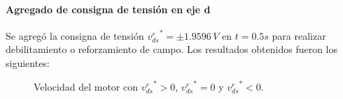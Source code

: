 \documentclass[a4paper, 10pt, onecolumn,journal]{ieeeconf}
\begin{document}
\paragraph{\textbf{Agregado de consigna de tensión en eje d}}
Se agregó la consigna de tensión ${v^r_{ds}}^* = \pm 1.9596 \, V $ en $t = 0.5 s$ para realizar debilitamiento o reforzamiento de campo. Los resultados obtenidos fueron los siguientes:

\begin{figure}[H]
	\centering
	\begin{adjustbox}{max width=\columnwidth}
	\end{adjustbox}
	\caption{Velocidad del motor con ${v^r_{ds}}^* > 0$, ${v^r_{ds}}^* = 0$ y ${v^r_{ds}}^* < 0$.}
	\label{Velocidad del motor con ${v^r_{ds}}^* > 0$, ${v^r_{ds}}^* = 0$ y ${V^r_{ds}}^* < 0$}
\end{figure}
\end{document}
